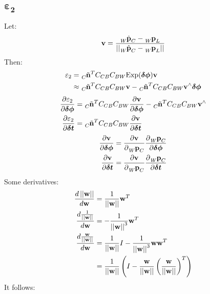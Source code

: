 \documentclass[10pt,a4paper]{article}
\numberwithin{equation}{section}
\renewcommand{\vec}[1]{\ensuremath{\mathbf{#1}}}
\newcommand{\vecs}[1]{\ensuremath{\boldsymbol{#1}}}
\newcommand{\norm}[1]{\ensuremath{\left|\left|#1\right|\right|}}
\newcommand{\Exp}{\mathrm{Exp}}
\begin{document}
\subsection{$\vecs{\varepsilon_2}$}
%
%
Let:
\begin{equation}
\vec{v} = \frac{\tensor[_W]{\hat{\vec{p}}}{_C} - \tensor[_W]{\vec{p}}{_L}}{\norm{\tensor[_W]{\hat{\vec{p}}}{_C} - \tensor[_W]{\vec{p}}{_L}}}
\end{equation}
Then:
\begin{align}
\varepsilon_2 &= \tensor[_C]{\tilde{\vec{n}}}{^T} C_{CB} C_{BW} \Exp(\vecs{\delta\phi}) \vec{v}\\
&\approx \tensor[_C]{\tilde{\vec{n}}}{^T} C_{CB} C_{BW} \vec{v} - \tensor[_C]{\tilde{\vec{n}}}{^T} C_{CB} C_{BW} \vec{v}^\wedge \vecs{\delta\phi}
\end{align}
\begin{align}
\frac{\partial\varepsilon_2}{\partial\vecs{\delta\phi}} &= \tensor[_C]{\tilde{\vec{n}}}{^T} C_{CB} C_{BW}\frac{\partial \vec{v}}{\partial\vecs{\delta\phi}} - \tensor[_C]{\tilde{\vec{n}}}{^T} C_{CB} C_{BW}\vec{v}^\wedge\\
\frac{\partial\varepsilon_2}{\partial\vecs{\delta t}} &= \tensor[_C]{\tilde{\vec{n}}}{^T} C_{CB} C_{BW}\frac{\partial\vec{v}}{\partial \vecs{\delta t}}
\end{align}
\begin{align}
\frac{\partial\vec{v}}{\partial\vecs{\delta\phi}} &= \frac{\partial \vec{v}}{\partial\tensor[_W]{\vec{p}}{_C}} \frac{\partial \tensor[_W]{\vec{p}}{_{C}}}{\partial \vecs{\delta\phi}}\\
\frac{\partial\vec{v}}{\partial\vecs{\delta t}} &= \frac{\partial \vec{v}}{\partial\tensor[_W]{\vec{p}}{_C}} \frac{\partial \tensor[_W]{\vec{p}}{_C}}{\partial \vecs{\delta t}} 
\end{align}
Some derivatives:
\begin{align}
\frac{d\norm{\vec{w}}}{d\vec{w}} &= \frac{1}{\norm{\vec{w}}}\vec{w}^T\\
\frac{d\frac{1}{\norm{\vec{w}}}}{d\vec{w}} &= -\frac{1}{\norm{\vec{w}}^3}\vec{w}^T\\
\frac{d\frac{\vec{w}}{\norm{\vec{w}}}}{d\vec{w}} &= \frac{1}{\norm{\vec{w}}}I - \frac{1}{\norm{\vec{w}}^3}\vec{w}\vec{w}^T\notag\\
&= \frac{1}{\norm{\vec{w}}}\left(I - \frac{\vec{w}}{\norm{\vec{w}}}\left(\frac{\vec{w}}{\norm{\vec{w}}}\right)^T\right)
\end{align}
It follows:
\end{document}
